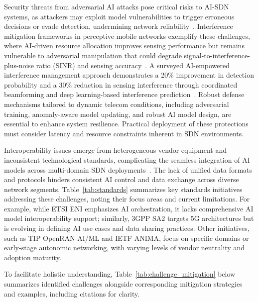 \documentclass[sigconf]{acmart}
\begin{document}
Security threats from adversarial AI attacks pose critical risks to AI-SDN systems, as attackers may exploit model vulnerabilities to trigger erroneous decisions or evade detection, undermining network reliability~\cite{ref48}. Interference mitigation frameworks in perceptive mobile networks exemplify these challenges, where AI-driven resource allocation improves sensing performance but remains vulnerable to adversarial manipulation that could degrade signal-to-interference-plus-noise ratio (SINR) and sensing accuracy~\cite{ref48}. A surveyed AI-empowered interference management approach demonstrates a 20\% improvement in detection probability and a 30\% reduction in sensing interference through coordinated beamforming and deep learning-based interference prediction~\cite{ref48}. Robust defense mechanisms tailored to dynamic telecom conditions, including adversarial training, anomaly-aware model updating, and robust AI model design, are essential to enhance system resilience. Practical deployment of these protections must consider latency and resource constraints inherent in SDN environments.

Interoperability issues emerge from heterogeneous vendor equipment and inconsistent technological standards, complicating the seamless integration of AI models across multi-domain SDN deployments~\cite{ref7}. The lack of unified data formats and protocols hinders consistent AI control and data exchange across diverse network segments. Table~\ref{tab:standards} summarizes key standards initiatives addressing these challenges, noting their focus areas and current limitations. For example, while ETSI ENI emphasizes AI orchestration, it lacks comprehensive AI model interoperability support; similarly, 3GPP SA2 targets 5G architectures but is evolving in defining AI use cases and data sharing practices. Other initiatives, such as TIP OpenRAN AI/ML and IETF ANIMA, focus on specific domains or early-stage autonomic networking, with varying levels of vendor neutrality and adoption maturity.

To facilitate holistic understanding, Table~\ref{tab:challenge_mitigation} below summarizes identified challenges alongside corresponding mitigation strategies and examples, including citations for clarity.
\end{document}
